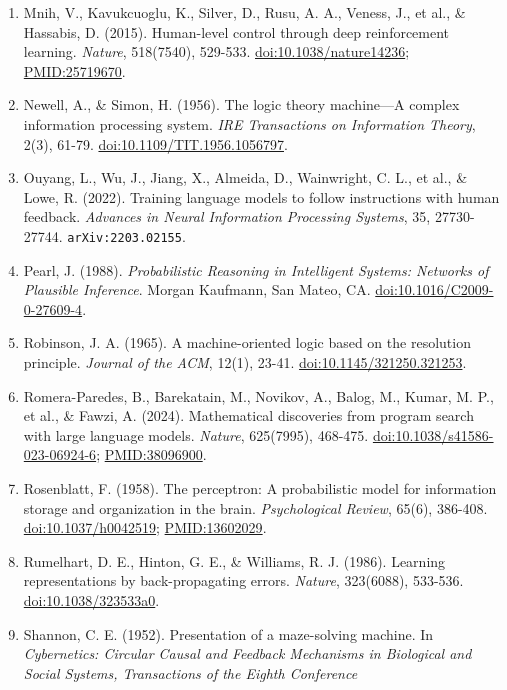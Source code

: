 \documentclass[10pt,letterpaper]{article}
\begin{document}
\begin{enumerate}
\item
  Mnih, V., Kavukcuoglu, K., Silver, D., Rusu, A. A., Veness, J., et
  al., \& Hassabis, D. (2015). Human-level control through deep
  reinforcement learning. \emph{Nature}, 518(7540), 529-533.
  \href{https://doi.org/10.1038/nature14236}{doi:10.1038/nature14236};
  \url{PMID:25719670}.
\item
  Newell, A., \& Simon, H. (1956). The logic theory machine---A complex
  information processing system. \emph{IRE Transactions on Information
  Theory}, 2(3), 61-79.
  \href{https://doi.org/10.1109/TIT.1956.1056797}{doi:10.1109/TIT.1956.1056797}.
\item
  Ouyang, L., Wu, J., Jiang, X., Almeida, D., Wainwright, C. L., et al.,
  \& Lowe, R. (2022). Training language models to follow instructions
  with human feedback. \emph{Advances in Neural Information Processing
  Systems}, 35, 27730-27744. \texttt{arXiv:2203.\allowbreak{}02155}.
\item
  Pearl, J. (1988). \emph{Probabilistic Reasoning in Intelligent
  Systems: Networks of Plausible Inference}. Morgan Kaufmann, San Mateo,
  CA.
  \href{https://doi.org/10.1016/C2009-0-27609-4}{doi:10.1016/C2009-0-27609-4}.
\item
  Robinson, J. A. (1965). A machine-oriented logic based on the
  resolution principle. \emph{Journal of the ACM}, 12(1), 23-41.
  \href{https://doi.org/10.1145/321250.321253}{doi:10.1145/321250.321253}.
\item
  Romera-Paredes, B., Barekatain, M., Novikov, A., Balog, M., Kumar, M.
  P., et al., \& Fawzi, A. (2024). Mathematical discoveries from program
  search with large language models. \emph{Nature}, 625(7995), 468-475.
  \href{https://doi.org/10.1038/s41586-023-06924-6}{doi:10.1038/s41586-023-06924-6};
  \url{PMID:38096900}.
\item
  Rosenblatt, F. (1958). The perceptron: A probabilistic model for
  information storage and organization in the brain. \emph{Psychological
  Review}, 65(6), 386-408.
  \href{https://doi.org/10.1037/h0042519}{doi:10.1037/h0042519};
  \url{PMID:13602029}.
\item
  Rumelhart, D. E., Hinton, G. E., \& Williams, R. J. (1986). Learning
  representations by back-propagating errors. \emph{Nature}, 323(6088),
  533-536.
  \href{https://doi.org/10.1038/323533a0}{doi:10.1038/323533a0}.
\item
  Shannon, C. E. (1952). Presentation of a maze-solving machine. In
  \emph{Cybernetics: Circular Causal and Feedback Mechanisms in
  Biological and Social Systems, Transactions of the Eighth Conference}

\end{enumerate}
\end{document}
